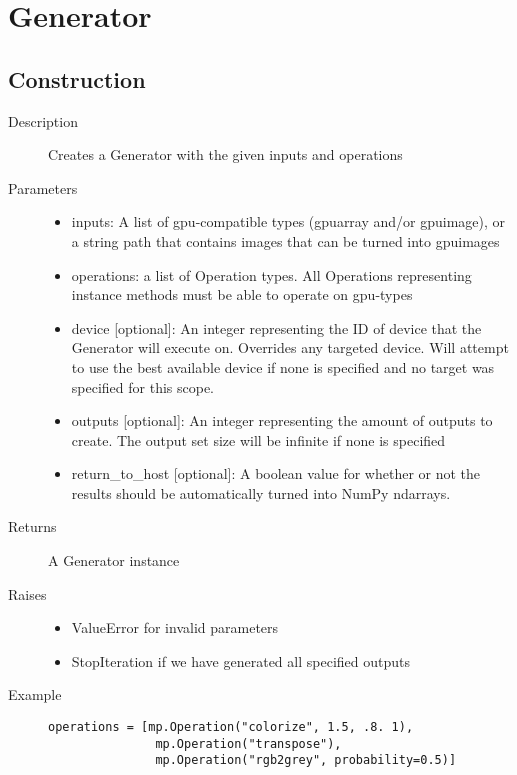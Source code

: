 
\section{Generator}

\subsection{Construction}

\begin{description}
   \item[Description] Creates a Generator with the given inputs and operations
   \item[Parameters] \phantom{}
   \begin{itemize}
       \item inputs: A list of gpu-compatible types (gpuarray and/or gpuimage), or a string path that contains images that can be turned into gpuimages
       \item operations: a list of Operation types. All Operations representing instance methods must be able to operate on gpu-types
       \item device [optional]: An integer representing the ID of device that the Generator will execute on. Overrides any targeted device. Will attempt to use the best available device if none is specified and no target was specified for this scope.
       \item outputs [optional]: An integer representing the amount of outputs to create. The output set size will be infinite if none is specified
       \item return\_to\_host [optional]: A boolean value for whether or not the results should be automatically turned into NumPy ndarrays. 
   \end{itemize}
   \item[Returns] A Generator instance
   \item[Raises] \phantom{}
   \begin{itemize}
       \item ValueError for invalid parameters
       \item StopIteration if we have generated all specified outputs
   \end{itemize}
   \item[Example] \phantom{}
   \begin{lstlisting}
operations = [mp.Operation("colorize", 1.5, .8. 1),
               mp.Operation("transpose"),
               mp.Operation("rgb2grey", probability=0.5)]


\end{lstlisting}
\end{description}
